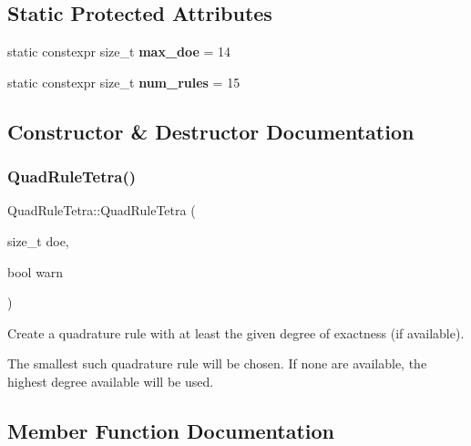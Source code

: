 \subsection*{Static Protected Attributes}
\begin{DoxyCompactItemize}
\item 
\mbox{\label{classHArDCore3D_1_1QuadRuleTetra_ab26709dc12bd459dcabe7c64a6976509}} 
static constexpr size\+\_\+t {\bfseries max\+\_\+doe} = 14
\item 
\mbox{\label{classHArDCore3D_1_1QuadRuleTetra_ab0c5c48d113c568e34353ccb1a9c5321}} 
static constexpr size\+\_\+t {\bfseries num\+\_\+rules} = 15
\end{DoxyCompactItemize}


\subsection{Constructor \& Destructor Documentation}
\mbox{\label{classHArDCore3D_1_1QuadRuleTetra_aa9690d2663c19c67d52b3cd176afa4b9}} 
\subsubsection{\texorpdfstring{Quad\+Rule\+Tetra()}{QuadRuleTetra()}}
{\footnotesize\ttfamily Quad\+Rule\+Tetra\+::\+Quad\+Rule\+Tetra (\begin{DoxyParamCaption}\item[{size\+\_\+t}]{doe,  }\item[{bool}]{warn }\end{DoxyParamCaption})}



Create a quadrature rule with at least the given degree of exactness (if available). 

The smallest such quadrature rule will be chosen. If none are available, the highest degree available will be used. 

\subsection{Member Function Documentation}
\mbox{\label{classHArDCore3D_1_1QuadRuleTetra_aaa2822c1275680abfc0ee93690b1a9b7}} 
